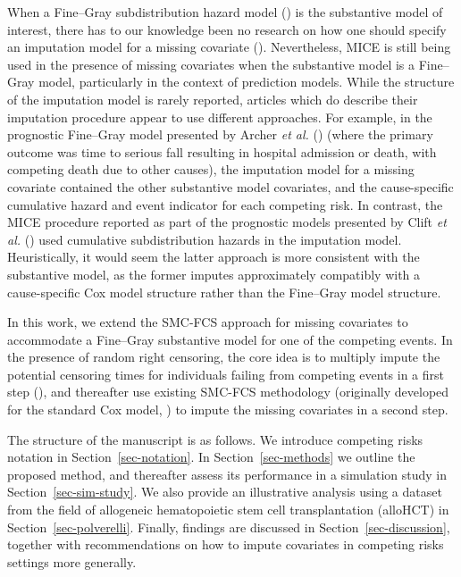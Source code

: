 \documentclass[
  letterpaper,
  DIV=11,
  numbers=noendperiod]{scrreprt}
\begin{document}
When a Fine--Gray subdistribution hazard model
()
is the substantive model of interest, there has to our knowledge been no
research on how one should specify an imputation model for a missing
covariate (). Nevertheless, MICE is still being used in the presence of
missing covariates when the substantive model is a Fine--Gray model,
particularly in the context of prediction models. While the structure of
the imputation model is rarely reported, articles which do describe
their imputation procedure appear to use different approaches. For
example, in the prognostic Fine--Gray model presented by Archer \emph{et
al.} ()
(where the primary outcome was time to serious fall resulting in
hospital admission or death, with competing death due to other causes),
the imputation model for a missing covariate contained the other
substantive model covariates, and the cause-specific cumulative hazard
and event indicator for each competing risk. In contrast, the MICE
procedure reported as part of the prognostic models presented by Clift
\emph{et al.} () used
cumulative subdistribution hazards in the imputation model.
Heuristically, it would seem the latter approach is more consistent with
the substantive model, as the former imputes approximately compatibly
with a cause-specific Cox model structure rather than the Fine--Gray
model structure.

In this work, we extend the SMC-FCS approach for missing covariates to
accommodate a Fine--Gray substantive model for one of the competing
events. In the presence of random right censoring, the core idea is to
multiply impute the potential censoring times for individuals failing
from competing events in a first step
(), and thereafter use existing SMC-FCS methodology (originally
developed for the standard Cox model,
) to impute the missing covariates in a second step.

The structure of the manuscript is as follows. We introduce competing
risks notation in Section~\ref{sec-notation}. In
Section~\ref{sec-methods} we outline the proposed method, and thereafter
assess its performance in a simulation study in
Section~\ref{sec-sim-study}. We also provide an illustrative analysis
using a dataset from the field of allogeneic hematopoietic stem cell
transplantation (alloHCT) in Section~\ref{sec-polverelli}. Finally,
findings are discussed in Section~\ref{sec-discussion}, together with
recommendations on how to impute covariates in competing risks settings
more generally.
\end{document}
